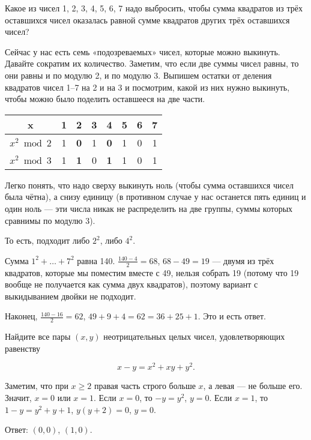 
\begin{itemize}

\itA Какое из чисел 1, 2, 3, 4, 5, 6, 7 надо выбросить, чтобы сумма квадратов из трёх оставшихся чисел оказалась равной сумме квадратов других трёх оставшихся чисел?

\itr Сейчас у нас есть семь «подозреваемых» чисел, которые можно выкинуть. Давайте сократим их количество. Заметим, что если две суммы чисел равны, то они равны и по модулю 2, и по модулю 3. Выпишем остатки от деления квадратов чисел 1–7 на 2 и на 3 и посмотрим, какой из них нужно выкинуть, чтобы можно было поделить оставшееся на две части.

\begin{center} \begin{tabular}{|c|c|c|c|c|c|c|c|}
	\hline
	x & 1 & \bfseries 2 & 3 & \bfseries 4 & 5 & 6 & 7 \\ \hline
	$x^2 \bmod 2$ & 1 & \bfseries 0 & 1 & \bfseries 0 & 1 & 0 & 1\\ \hline
	$x^2 \bmod 3$ & 1 & \bfseries 1 & 0 & \bfseries 1 & 1 & 0 & 1\\ \hline
\end{tabular} \end{center}

Легко понять, что надо сверху выкинуть ноль (чтобы сумма оставшихся чисел была чётна), а снизу единицу (в противном случае у нас останется пять единиц и один ноль — эти числа никак не распределить на две группы, суммы которых сравнимы по модулю 3).

То есть, подходит либо $2^2$, либо $4^2$.

Сумма $1^2 + \ldots + 7^2$ равна 140. $\tfrac{140-4}{2}=68$, $68-49=19$ — двумя из трёх квадратов, которые мы поместим вместе с 49, нельзя собрать 19 (потому что 19 вообще не получается как сумма двух квадратов), поэтому вариант с выкидыванием двойки не подходит.

Наконец, $\tfrac{140-16}{2} = 62$, $49+9+4=62=36+25+1$. Это и есть ответ.

\itC Найдите все пары $(x, y)$ неотрицательных целых чисел, удовлетворяющих равенству

$$x-y=x^2+xy+y^2.$$

\itr Заметим, что при $x \ge 2$ правая часть строго больше $x$, а левая — не больше его. Значит, $x=0$ или $x=1$. Если $x=0$, то $-y = y^2$, $y=0$. Если $x=1$, то $1-y=y^2+y+1$, $y(y+2)=0$, $y=0$.

Ответ: $(0,0)$, $(1,0)$.
\end{itemize}


